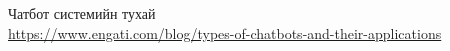 \singlespace
{}
\begin{thebibliography}{99}
	Чатбот системийн тухай
	\\\url{https://www.engati.com/blog/types-of-chatbots-and-their-applications}
\end{thebibliography}
